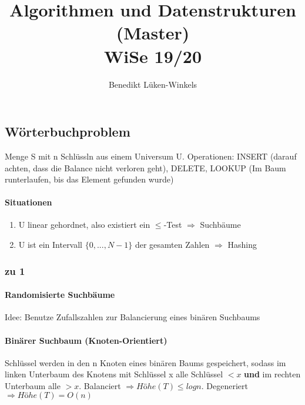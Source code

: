 \documentclass[ngerman]{scrartcl}
\title{Algorithmen und Datenstrukturen (Master) \\ WiSe 19/20}
\author{Benedikt Lüken-Winkels}
\begin{document}
\maketitle
\tableofcontents
\newpage


\subsection*{Wörterbuchproblem}
Menge S mit n Schlüssln aus einem Universum U.
Operationen: INSERT (darauf achten, dass die Balance nicht verloren geht), DELETE, LOOKUP (Im Baum runterlaufen, bis das Element gefunden wurde)
\paragraph{Situationen}
\begin{enumerate}
    \item U linear gehordnet, also existiert ein $ \leq $-Test $ \Rightarrow $ Suchbäume
    \item U ist ein Intervall $ \{0,..., N-1\} $ der gesamten Zahlen $ \Rightarrow $ Hashing
\end{enumerate}
\subsubsection*{zu 1}
\paragraph{Randomisierte Suchbäume}
Idee: Benutze Zufallszahlen zur Balancierung eines binären Suchbaums
\paragraph{Binärer Suchbaum (Knoten-Orientiert)}
Schlüssel werden in den n Knoten eines binären Baums gespeichert, sodass im linken Unterbaum des Knotens mit Schlüssel x alle Schlüssel $ < x $ \textbf{und} im rechten Unterbaum alle $ > x $. Balanciert $ \Rightarrow Höhe(T)\leq logn$.  Degeneriert $ \Rightarrow Höhe(T) = O(n)$
\end{document}
